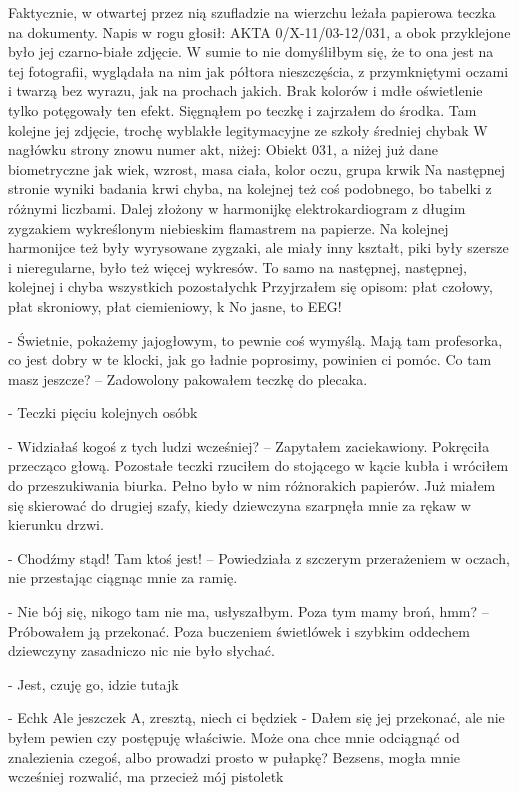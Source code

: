 \documentclass[../MAIN.tex]{subfiles}
\begin{document}
Faktycznie, w otwartej przez nią szufladzie na wierzchu leżała papierowa teczka na dokumenty. Napis w rogu głosił: AKTA 0/X-11/03-12/031, a obok przyklejone było jej czarno-białe zdjęcie. W sumie to nie domyśliłbym się, że to ona jest na tej fotografii, wyglądała na nim jak półtora nieszczęścia, z przymkniętymi oczami i twarzą bez wyrazu, jak na prochach jakich. Brak kolorów i mdłe oświetlenie tylko potęgowały ten efekt. Sięgnąłem po teczkę i zajrzałem do środka. Tam kolejne jej zdjęcie, trochę wyblakłe legitymacyjne ze szkoły średniej chyba\3k W nagłówku strony znowu numer akt, niżej: Obiekt 031, a niżej już dane biometryczne jak wiek, wzrost, masa ciała, kolor oczu, grupa krwi\3k Na następnej stronie wyniki badania krwi chyba, na kolejnej też coś podobnego, bo tabelki z różnymi liczbami. Dalej złożony w harmonijkę elektrokardiogram z długim zygzakiem wykreślonym niebieskim flamastrem na papierze. Na kolejnej harmonijce też były wyrysowane zygzaki, ale miały inny kształt, piki były szersze i nieregularne, było 
też więcej wykresów. To samo na następnej, następnej, kolejnej i chyba wszystkich pozostałych\3k Przyjrzałem się opisom: płat czołowy, płat skroniowy, płat ciemieniowy, \3k No jasne, to EEG!

- Świetnie, pokażemy jajogłowym, to pewnie coś wymyślą. Mają tam profesorka, co jest dobry w te klocki, jak go ładnie poprosimy, powinien ci pomóc. Co tam masz jeszcze? – Zadowolony pakowałem teczkę do plecaka.

- Teczki pięciu kolejnych osób\3k

- Widziałaś kogoś z tych ludzi wcześniej? – Zapytałem zaciekawiony. Pokręciła przecząco głową. Pozostałe teczki rzuciłem do stojącego w kącie kubła i wróciłem do przeszukiwania biurka. Pełno było w nim różnorakich papierów. Już miałem się skierować do drugiej szafy, kiedy dziewczyna szarpnęła mnie za rękaw w kierunku drzwi.

- Chodźmy stąd! Tam ktoś jest! – Powiedziała z szczerym przerażeniem w oczach, nie przestając ciągnąc mnie za ramię.

- Nie bój się, nikogo tam nie ma, usłyszałbym. Poza tym mamy broń, hmm? – Próbowałem ją przekonać. Poza buczeniem świetlówek i szybkim oddechem dziewczyny zasadniczo nic nie było słychać.

- Jest, czuję go, idzie tutaj\3k

- Ech\3k Ale jeszcze\3k A, zresztą, niech ci będzie\3k - Dałem się jej przekonać, ale nie byłem pewien czy postępuję właściwie. Może ona chce mnie odciągnąć od znalezienia czegoś, albo prowadzi prosto w pułapkę? Bezsens, mogła mnie wcześniej rozwalić, ma przecież mój pistolet\3k
\end{document}
